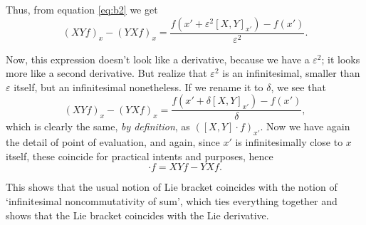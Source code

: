 \documentclass{article}
\theoremstyle{definition}
\begin{document}
Thus, from equation \eqref{eq:b2} we get
\begin{equation}
(XYf)_x - (YX f)_x =\frac{f(x' + \varepsilon^2 [X,Y]_{x'}) - f(x')}{\varepsilon^2}.
\end{equation}

Now, this expression doesn't look like a derivative, because we have a $\varepsilon^2$; it looks more like a second derivative. But realize that $\varepsilon^2$ is an infinitesimal, smaller than $\varepsilon$ itself, but an infinitesimal nonetheless. If we rename it to $\delta$, we see that
\begin{equation}
(XYf)_x - (YX f)_x =\frac{f(x' + \delta [X,Y]_{x'}) - f(x')}{\delta},
\end{equation}
which is clearly the same, \emph{by definition}, as $([X,Y] \cdot f)_{x'}$. Now we have again the detail of point of evaluation, and again, since $x'$ is infinitesimally close to $x$ itself, these coincide for practical intents and purposes, hence
\begin{equation}
[X,Y] \cdot f = XYf - YXf.
\end{equation}

This shows that the usual notion of Lie bracket coincides with the notion of `infinitesimal noncommutativity of sum', which ties everything together and shows that the Lie bracket coincides with the Lie derivative.
\end{document}
